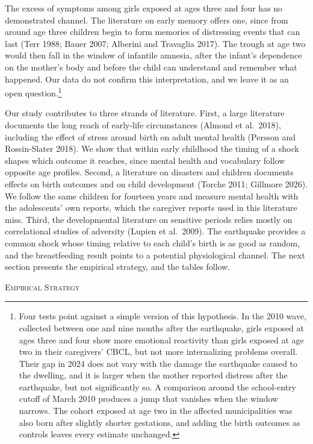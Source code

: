 \documentclass[12pt]{article}
\begin{document}
The excess of symptoms among girls exposed at ages three and four has no
demonstrated channel. The literature on early memory offers one, since from
around age three children begin to form memories of distressing events that
can last (Terr 1988; Bauer 2007; Alberini and Travaglia 2017). The trough at
age two would then fall in the window of infantile amnesia, after the
infant's dependence on the mother's body and before the child can
understand and remember what happened. Our data do not confirm this
interpretation, and we leave it as an open question.\footnote{Four tests
point against a simple version of this hypothesis. In the 2010 wave,
collected between one and nine months after the earthquake, girls exposed
at ages three and four show more emotional reactivity than girls exposed at
age two in their caregivers' CBCL, but not more internalizing problems
overall. Their gap in 2024 does not vary with the damage the earthquake
caused to the dwelling, and it is larger when the mother reported distress
after the earthquake, but not significantly so. A comparison around the
school-entry cutoff of March 2010 produces a jump that vanishes when the
window narrows. The cohort exposed at age two in the affected
municipalities was also born after slightly shorter gestations, and adding
the birth outcomes as controls leaves every estimate unchanged.}

Our study contributes to three strands of literature. First, a large
literature documents the long reach of early-life circumstances (Almond et
al.\ 2018), including the effect of stress around birth on adult mental
health (Persson and Rossin-Slater 2018). We show that within early
childhood the timing of a shock shapes which outcome it reaches, since
mental health and vocabulary follow opposite age profiles. Second, a
literature on disasters and children documents effects on birth outcomes
and on child development (Torche 2011; Gillmore 2026). We follow the same
children for fourteen years and measure mental health with the adolescents'
own reports, which the caregiver reports used in this literature miss.
Third, the developmental literature on sensitive periods relies mostly on
correlational studies of adversity (Lupien et al.\ 2009). The earthquake
provides a common shock whose timing relative to each child's birth is as
good as random, and the breastfeeding result points to a potential
physiological channel. The next section presents the empirical strategy,
and the tables follow.

\begin{center}
{\scshape Empirical Strategy}
\end{center}
\end{document}
